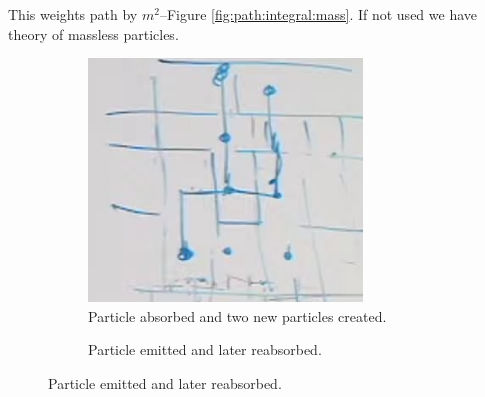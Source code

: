 \documentclass[]{article}
\begin{document}
This weights path by $m^2$--Figure \ref{fig:path:integral:mass}. If not used we have theory of massless particles.

\begin{figure}[H]
	\caption{Some possibilities from $\phi^3$}
	\begin{subfigure}{0.4\textwidth}
	\caption{Particle absorbed and two new particles created.}\label{fig:path:integral:cubic}
		\includegraphics[width=0.8\textwidth]{path-integral-cubic}
	\end{subfigure}
	\begin{subfigure}{0.4\textwidth}
		\caption{Particle emitted and later reabsorbed.}\label{fig:path:integral:cubic:split}

\end{subfigure}
\end{figure}
\end{document}

